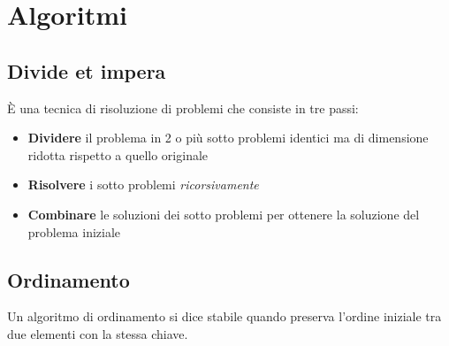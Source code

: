 \newpage

\section{Algoritmi}
\subsection{Divide et impera}
È una tecnica di risoluzione di problemi che consiste in tre passi:
\begin{itemize}
	\item \textbf{Dividere} il problema in 2 o più sotto problemi identici ma di dimensione ridotta rispetto a quello originale
	\item \textbf{Risolvere} i sotto problemi \emph{ricorsivamente}
	\item \textbf{Combinare} le soluzioni dei sotto problemi per ottenere la soluzione del problema iniziale
\end{itemize}
\subsection{Ordinamento}
\begin{definition}
	Un algoritmo di ordinamento si dice stabile quando preserva l'ordine iniziale tra due elementi con la stessa chiave.
\end{definition}
